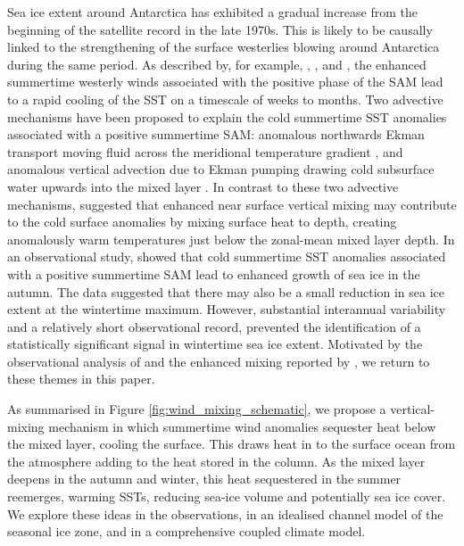 \documentclass{ametsocV5}
\begin{document}
Sea ice extent around Antarctica has exhibited a gradual increase from the beginning of the satellite record in the late 1970s. This is likely to be causally linked to the strengthening of the surface westerlies blowing around Antarctica during the same period. As described by, for example, \citet{Ferreira2015}, \citet{Purich2016}, \citet{Doddridge2017} and \citet{Kostov2017}, the enhanced summertime westerly winds associated with the positive phase of the SAM lead to a rapid cooling of the SST on a timescale of weeks to months. Two advective mechanisms have been proposed to explain the cold summertime SST anomalies associated with a positive summertime SAM: anomalous northwards Ekman transport moving fluid across the meridional temperature gradient \citep{Ferreira2015,Kostov2017}, and anomalous vertical advection due to Ekman pumping drawing cold subsurface water upwards into the mixed layer \citep{Purich2016}. In contrast to these two advective mechanisms, \citet{Doddridge2019a} suggested that enhanced near surface vertical mixing may contribute to the cold surface anomalies by mixing surface heat to depth, creating anomalously warm temperatures just below the zonal-mean mixed layer depth. In an observational study, \citet{Doddridge2017} showed that cold summertime SST anomalies associated with a positive summertime SAM lead to enhanced growth of sea ice in the autumn. The data suggested that there may also be a small reduction in sea ice extent at the wintertime maximum. However, substantial interannual variability and a relatively short observational record, prevented the identification of a statistically significant signal in wintertime sea ice extent. Motivated by the observational analysis of \citet{Doddridge2017} and the enhanced mixing reported by \citet{Doddridge2019a}, we return to these themes in this paper. 

As summarised in Figure \ref{fig:wind_mixing_schematic}, we propose a vertical-mixing mechanism in which summertime wind anomalies sequester heat below the mixed layer, cooling the surface. This draws heat in to the surface ocean from the atmosphere adding to the heat stored in the column. As the mixed layer deepens in the autumn and winter, this heat sequestered in the summer reemerges, warming SSTs, reducing sea-ice volume and potentially sea ice cover. We explore these ideas in the observations, in an idealised channel model of the seasonal ice zone, and in a comprehensive coupled climate model.
\end{document}
